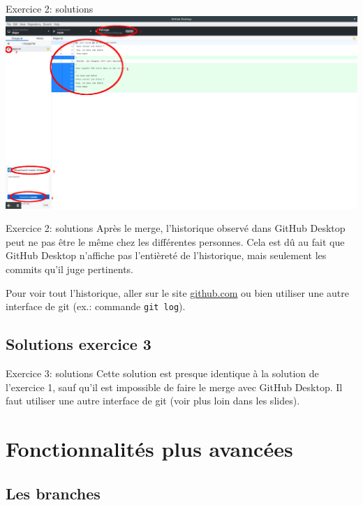 \documentclass{beamer}
\begin{document}
\begin{frame}{Exercice 2: solutions}
	\centering
    \includegraphics[width=\textwidth]{img/image_exercices/conflic_resolv.png}
\end{frame}

\begin{frame}{Exercice 2: solutions}
    Après le merge, l'historique observé dans GitHub Desktop peut ne pas être
    le même chez les différentes personnes.
    Cela est dû au fait que GitHub Desktop n'affiche pas l'entièreté de
    l'historique, mais seulement les commits qu'il juge pertinents.

    Pour voir tout l'historique, aller sur le site \url{github.com} ou bien
    utiliser une autre interface de git (ex.: commande \texttt{git log}).
\end{frame}

\subsection{Solutions exercice 3}

\begin{frame}{Exercice 3: solutions}
    Cette solution est presque identique à la solution de l'exercice 1, sauf
    qu'il est impossible de faire le merge avec GitHub Desktop. Il faut
    utiliser une autre interface de git (voir plus loin dans les slides).
\end{frame}

\section{Fonctionnalités plus avancées}

\subsection{Les branches}
\end{document}
